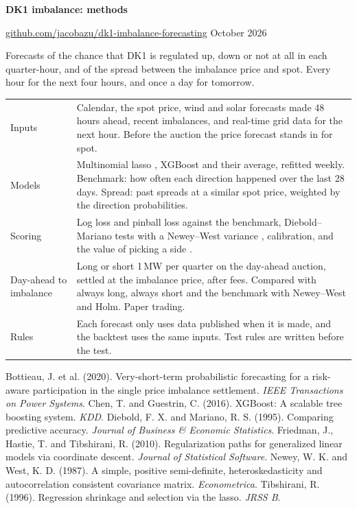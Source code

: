 \documentclass[11pt,a4paper]{article}
\begin{document}
{\sffamily\bfseries\Large DK1 imbalance: methods}\par
\href{https://github.com/jacobazu/dk1-imbalance-forecasting}{github.com/jacobazu/dk1-imbalance-forecasting} \textperiodcentered{} October 2026

Forecasts of the chance that DK1 is regulated up, down or not at all in each quarter-hour, and of the spread between the imbalance price and spot. Every hour for the next four hours, and once a day for tomorrow.

\begin{center}\small
\begin{tabularx}{\linewidth}{@{}lL@{}}
\toprule
Inputs & Calendar, the spot price, wind and solar forecasts made 48 hours ahead, recent imbalances, and real-time grid data for the next hour. Before the auction the price forecast stands in for spot. \\
Models & Multinomial lasso \citep{tibshirani1996,friedman2010}, XGBoost \citep{chen2016} and their average, refitted weekly. Benchmark: how often each direction happened over the last 28 days. Spread: past spreads at a similar spot price, weighted by the direction probabilities. \\
Scoring & Log loss and pinball loss against the benchmark, Diebold--Mariano tests with a Newey--West variance \citep{diebold1995,newey1987}, calibration, and the value of picking a side \citep{bottieau2020}. \\
Day-ahead to imbalance & Long or short 1\,MW per quarter on the day-ahead auction, settled at the imbalance price, after fees. Compared with always long, always short and the benchmark with Newey--West and Holm. Paper trading. \\
Rules & Each forecast only uses data published when it is made, and the backtest uses the same inputs. Test rules are written before the test. \\
\bottomrule
\end{tabularx}
\end{center}

\begin{thebibliography}{99}\small
{} Bottieau, J. et al. (2020). Very-short-term probabilistic forecasting for a risk-aware participation in the single price imbalance settlement. \textit{IEEE Transactions on Power Systems}.
 Chen, T. and Guestrin, C. (2016). XGBoost: A scalable tree boosting system. \textit{KDD}.
 Diebold, F. X. and Mariano, R. S. (1995). Comparing predictive accuracy. \textit{Journal of Business \& Economic Statistics}.
 Friedman, J., Hastie, T. and Tibshirani, R. (2010). Regularization paths for generalized linear models via coordinate descent. \textit{Journal of Statistical Software}.
 Newey, W. K. and West, K. D. (1987). A simple, positive semi-definite, heteroskedasticity and autocorrelation consistent covariance matrix. \textit{Econometrica}.
 Tibshirani, R. (1996). Regression shrinkage and selection via the lasso. \textit{JRSS B}.
\end{thebibliography}
\end{document}

